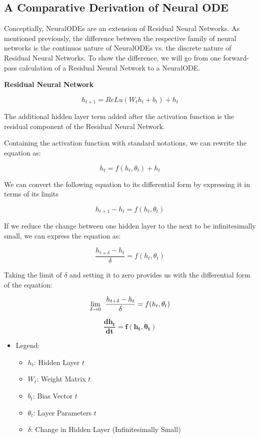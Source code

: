 \documentclass{article}
\begin{document}
\subsection{A Comparative Derivation of Neural ODE}

Conceptially, NeuralODEs are an extension of Residual Neural Networks. As mentioned previously, the difference between the respective
family of neural networks is the continuos nature of NeuralODEs vs. the discrete nature of Residual Neural Networks. To show the difference,
we will go from one forward-pass calculation of a Residual Neural Network to a NeuralODE.

\textbf{Residual Neural Network}

\[
   h_{t+1} = ReLu(W_{t}h_{t} + b_{t}) + h_{t}
\]

The additional hidden layer term added after the activation function is the residual component of the Residual Neural Network.

Containing the activation function with standard notations, we can rewrite the equation as:

\[
   h_{t} = f(h_{t}, \theta_{t}) + h_{t}
\]

We can convert the following equation to its differential form by expressing it in terms of its limits

\[
   h_{t+1} - h_{t} = f(h_{t}, \theta_{t})
\]

If we reduce the change between one hidden layer to the next to be infinitesimally small, we can express the equation as:

\[
   \frac{h_{t+\delta} - h_{t}}{\delta} = f(h_{t}, \theta_{t})
\]

Taking the limit of $\delta$ and setting it to zero provides us with the differential form of the equation:

\[
   \lim_{\delta \to 0} \hspace*{1ex} \frac{h_{t+\delta} - h_{t}}{\delta} = f(h_{t}, \theta_{t})
\]

\[
   \mathbf{\frac{dh_{t}}{dt} = f(h_{t}, \theta_{t})}
\]

\begin{itemize}
   \item Legend:
   \begin{itemize}
      \item $h_{t}$: Hidden Layer $t$
      \item $W_{t}$: Weight Matrix $t$
      \item $b_{t}$: Bias Vector $t$
      \item $\theta_{t}$: Layer Parameters $t$
      \item $\delta$: Change in Hidden Layer (Infinitesimally Small)
   \end{itemize}
\end{itemize}
\end{document}
